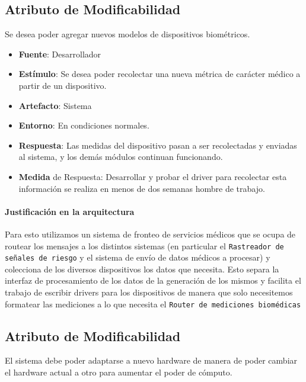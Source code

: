 \subsection{Atributo de Modificabilidad}
Se desea poder agregar nuevos modelos de dispositivos biométricos.

\begin{itemize}
  \item \textbf{Fuente}: Desarrollador
  \item \textbf{Estímulo}: Se desea poder recolectar una nueva métrica de carácter médico a partir de un dispositivo.
  \item \textbf{Artefacto}: Sistema
  \item \textbf{Entorno}: En condiciones normales.
  \item \textbf{Respuesta}: Las medidas del dispositivo pasan a ser recolectadas y enviadas al sistema, y los demás módulos continuan funcionando.
  \item \textbf{Medida} de Respuesta: Desarrollar y probar el driver para recolectar esta información se realiza en menos de dos semanas hombre de trabajo.
\end{itemize}

\paragraph{Justificación en la arquitectura}

Para esto utilizamos un sistema de fronteo de servicios médicos que se ocupa de routear los mensajes a los
distintos sistemas (en particular el \texttt{Rastreador de señales de riesgo} y el sistema de envío de datos
médicos a procesar) y colecciona de los diversos dispositivos los datos que necesita. Esto separa la interfaz
de procesamiento de los datos de la generación de los mismos y facilita el trabajo de escribir drivers para los
dispositivos de manera que solo necesitemos formatear las mediciones a lo que necesita el \texttt{Router de
mediciones biomédicas}

\subsection{Atributo de Modificabilidad}
El sistema debe poder adaptarse a nuevo hardware de manera de poder cambiar el hardware actual a otro para aumentar el poder de cómputo.

